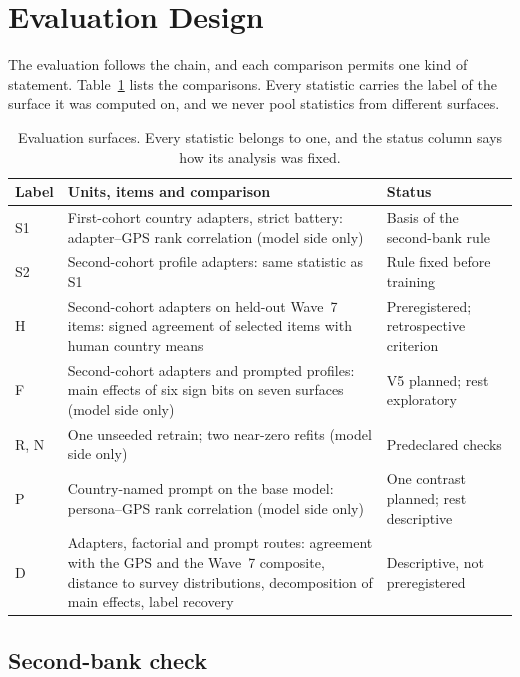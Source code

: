 \section{Evaluation Design}\label{sec:design}

The evaluation follows the chain, and each comparison permits one kind of statement. Table~\ref{tab:surfaces} lists the comparisons. Every statistic carries the label of the surface it was computed on, and we never pool statistics from different surfaces.

\begin{table}[htbp]
\centering
\caption{Evaluation surfaces. Every statistic belongs to one, and the status column says how its analysis was fixed.}\label{tab:surfaces}
\small
\renewcommand{\arraystretch}{1.15}
\begin{tabularx}{\textwidth}{@{}l>{\raggedright\arraybackslash}X>{\raggedright\arraybackslash}p{}@{}}
\toprule
Label & Units, items and comparison & Status \\
\midrule
S1 & First-cohort country adapters, strict battery: adapter--GPS rank correlation (model side only) & Basis of the second-bank rule \\
S2 & Second-cohort profile adapters: same statistic as S1 & Rule fixed before training \\
H & Second-cohort adapters on held-out Wave~7 items: signed agreement of selected items with human country means & Preregistered; retrospective criterion \\
F & Second-cohort adapters and prompted profiles: main effects of six sign bits on seven surfaces (model side only) & V5 planned; rest exploratory \\
R, N & One unseeded retrain; two near-zero refits (model side only) & Predeclared checks \\
P & Country-named prompt on the base model: persona--GPS rank correlation (model side only) & One contrast planned; rest descriptive \\
D & Adapters, factorial and prompt routes: agreement with the GPS and the Wave~7 composite, distance to survey distributions, decomposition of main effects, label recovery & Descriptive, not preregistered \\
\bottomrule
\end{tabularx}
\end{table}

\subsection{Second-bank check}\label{sec:design-bank}

